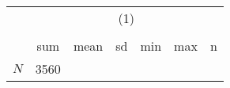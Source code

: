 {
\def\sym#1{\ifmmode^{#1}\else\(^{#1}\)\fi}
\begin{tabular}{l*{1}{cccccc}}
\hline\hline
            &\multicolumn{6}{c}{(1)}                                                      \\
            &\multicolumn{6}{c}{}                                                         \\
            &         sum&        mean&          sd&         min&         max&           n\\
\hline
\hline
\(N\)       &        3560&            &            &            &            &            \\
\hline\hline
\end{tabular}
}
